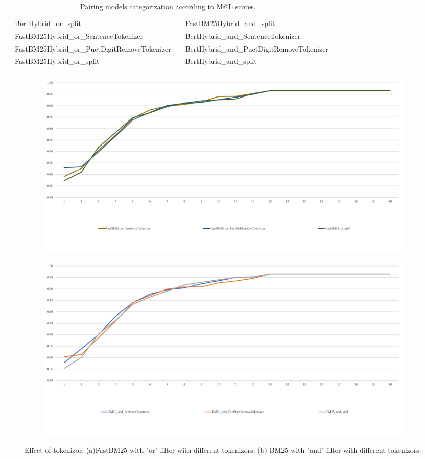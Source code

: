 \documentclass[10pt,a4paper,fleqn]{report}
\begin{document}
\begin{table}[htbp]
{\begin{tabular}{rrrr}
							& \multicolumn{1}{l}{BertHybrid\_or\_split} &       & \multicolumn{1}{l}{FastBM25Hybrid\_and\_split} \\
							& \multicolumn{1}{l}{FastBM25Hybrid\_or\_SentenceTokenizer} &       & \multicolumn{1}{l}{BertHybrid\_and\_SentenceTokenizer} \\
							& \multicolumn{1}{l}{FastBM25Hybrid\_or\_PuctDigitRemoveTokenizer} &       & \multicolumn{1}{l}{BertHybrid\_and\_PuctDigitRemoveTokenizer} \\
							& \multicolumn{1}{l}{FastBM25Hybrid\_or\_split} &       & \multicolumn{1}{l}{BertHybrid\_and\_split} \\
							\midrule
							&       &       &  \\
						\end{tabular}}
					\caption{Pairing models categorization according to M@L scores.}
					\label{tab: pairingcategorization}%
				\end{table}%
								
				\begin{figure}[htbp]
					\centering
					\begin{subfigure}[b]{0.8\textwidth}
						\centering
						\includegraphics[width=\textwidth]{figure/partB_pairing_tokenizor_or.png}
						\caption{}
						\label{fig: pairingtokenizoreffect_or}
					\end{subfigure}
					\hfill
					\begin{subfigure}[b]{0.8\textwidth}
						\centering
						\includegraphics[width=\textwidth]{figure/partB_pairing_tokenizor_and.png}
						\caption{}
						\label{fig: pairingtokenizoreffect_and}
					\end{subfigure}
					\hfill
					\caption[]{Effect of tokenizor. (a)FastBM25 with "or" filter with different tokenizors. (b) BM25 with "and" filter with different tokenizors.}
					\label{fig: pairingtokenizoreffect}
				\end{figure}
			
\end{document}
